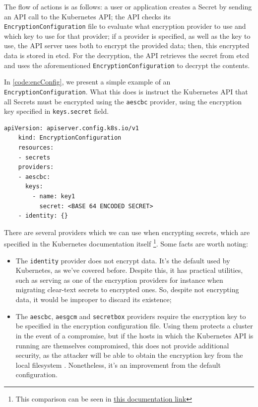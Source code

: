 \documentclass[a4paper,11pt,openright,BCOR=15mm]{scrbook}
\begin{document}
The flow of actions is as follows: a user or application creates a Secret by sending an API call to the Kubernetes API; the API checks its \texttt{EncryptionConfiguration} file to evaluate what encryption provider to use and which key to use for that provider; if a provider is specified, as well as the key to use, the API server uses both to encrypt the provided data; then, this encrypted data is stored in etcd. For the decryption, the API retrieves the secret from etcd and uses the aforementioned \texttt{EncryptionConfiguration} to decrypt the contents.

In \ref{code:encConfig}, we present a simple example of an \texttt{EncryptionConfiguration}. What this does is instruct the Kubernetes API that all Secrets must be encrypted using the \texttt{aescbc} provider, using the encryption key specified in \texttt{keys.secret} field.


\begin{lstlisting}[style=yaml,caption={EncryptionConfig example},label=code:encConfig]
	apiVersion: apiserver.config.k8s.io/v1
	kind: EncryptionConfiguration
	resources:
	- secrets
	providers:
	- aescbc:
	  keys:
	    - name: key1
	      secret: <BASE 64 ENCODED SECRET>
	- identity: {}
\end{lstlisting}

There are several providers which we can use when encrypting secrets, which are specified in the Kubernetes documentation itself \footnote{This comparison can be seen in \href{https://kubernetes.io/docs/tasks/administer-cluster/encrypt-data/\#providers}{\underline{this documentation link}}}. Some facts are worth noting:

\begin{itemize}
	\item The \texttt{identity} provider does not encrypt data. It's the default used by Kubernetes, as we've covered before. Despite this, it has practical utilities, such as serving as one of the encryption providers for instance when migrating clear-text secrets to encrypted ones. So, despite not encrypting data, it would be improper to discard its existence;
	\item The \texttt{aescbc}, \texttt{aesgcm} and \texttt{secretbox} providers require the encryption key to be specified in the encryption configuration file. Using them protects a cluster in the event of a compromise, but if the hosts in which the Kubernetes API is running are themselves compromised, this does not provide additional security, as the attacker will be able to obtain the encryption key from the local filesystem \cite{gkatziouras_kubernetes_2024}. Nonetheless, it's an improvement from the default configuration.
\end{itemize}
\end{document}
